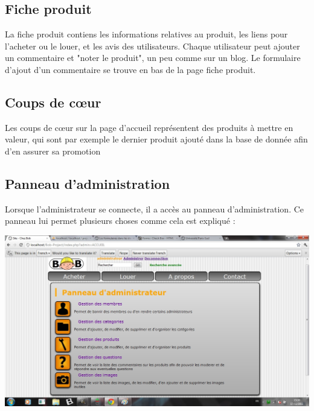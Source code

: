 	\subsection{Fiche produit}

	La fiche produit contiens les informations relatives au produit, les liens pour l'acheter ou le louer, et les avis des utilisateurs.
Chaque utilisateur peut ajouter un commentaire et "noter le produit", un peu comme sur un blog. Le formulaire d'ajout d'un commentaire se trouve en
bas de la page fiche produit. 
		
	\subsection{Coups de cœur}

	Les coups de cœur sur la page d'accueil représentent des produits à mettre en valeur, qui sont par exemple le dernier produit ajouté dans la base de donnée afin d'en assurer sa promotion
		
	\subsection{Panneau d'administration}

	Lorsque l'administrateur se connecte, il a accès au panneau d'administration. Ce panneau lui permet plusieurs choses comme cela est expliqué :
	
	\includegraphics[scale=0.5]{panneauadmin.jpg}